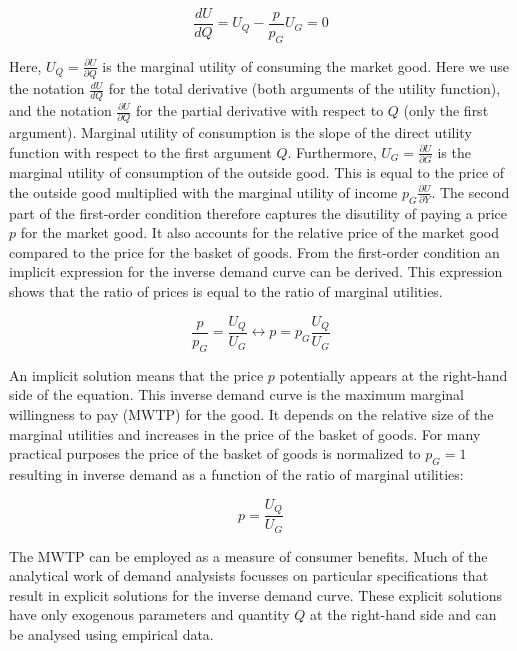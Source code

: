 \documentclass[
]{book}
\begin{document}
\begin{equation}
\frac{dU}{dQ} = U_Q - \frac{p}{p_G}U_G = 0
\end{equation}

Here, \(U_Q=\frac{\partial U}{\partial Q}\) is the marginal utility of consuming the market good. Here we use the notation \(\frac{dU}{dQ}\) for the total derivative (both arguments of the utility function), and the notation \(\frac{\partial U}{\partial Q}\) for the partial derivative with respect to \(Q\) (only the first argument). Marginal utility of consumption is the slope of the direct utility function with respect to the first argument \(Q\). Furthermore, \(U_G=\frac{\partial U}{\partial G}\) is the marginal utility of consumption of the outside good. This is equal to the price of the outside good multiplied with the marginal utility of income \(p_G \frac{\partial U}{\partial Y}\). The second part of the first-order condition therefore captures the disutility of paying a price \(p\) for the market good. It also accounts for the relative price of the market good compared to the price for the basket of goods. From the first-order condition an implicit expression for the inverse demand curve can be derived. This expression shows that the ratio of prices is equal to the ratio of marginal utilities.

\begin{equation}
\frac{p}{p_G} = \frac{U_Q}{U_G} \longleftrightarrow p = p_G\frac{U_Q}{U_G}
\end{equation}

An implicit solution means that the price \(p\) potentially appears at the right-hand side of the equation. This inverse demand curve is the maximum marginal willingness to pay (MWTP) for the good. It depends on the relative size of the marginal utilities and increases in the price of the basket of goods. For many practical purposes the price of the basket of goods is normalized to \(p_G=1\) resulting in inverse demand as a function of the ratio of marginal utilities:

\begin{equation} 
p = \frac{U_Q}{U_G}
\end{equation}

The MWTP can be employed as a measure of consumer benefits. Much of the analytical work of demand analysists focusses on particular specifications that result in explicit solutions for the inverse demand curve. These explicit solutions have only exogenous parameters and quantity \(Q\) at the right-hand side and can be analysed using empirical data.
\end{document}
